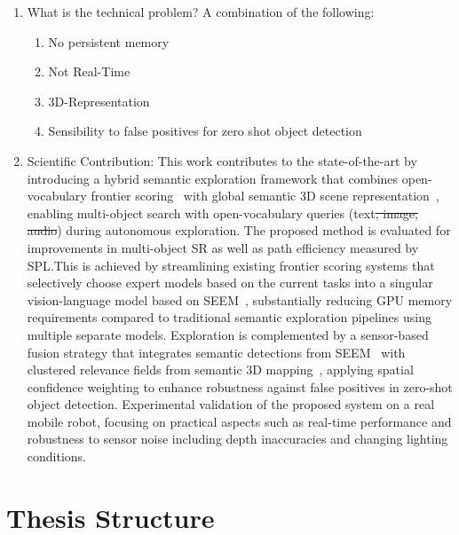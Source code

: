 \begin{enumerate}
    \item What is the technical problem? A combination of the following:
    \begin{enumerate}
        \item No persistent memory
        \item Not Real-Time
        \item 3D-Representation
        \item Sensibility to false positives for zero shot object detection
    \end{enumerate}
    \item Scientific Contribution:
        This work contributes to the state-of-the-art by introducing a hybrid semantic exploration framework that combines open-vocabulary frontier scoring~\cite{yokoyama2024vlfm} with global semantic 3D scene representation~\cite{kashu2023openfusion}, enabling multi-object search with open-vocabulary queries (text\sout{, image, audio}) during autonomous exploration. The proposed method is evaluated for improvements in multi-object \ac{SR} as well as path efficiency measured by \ac{SPL}.This is achieved by streamlining existing frontier scoring systems that selectively choose expert models based on the current tasks into a singular vision-language model based on \ac{SEEM}~\cite{zou2023seem}, substantially reducing GPU memory requirements compared to traditional semantic exploration pipelines using multiple separate models. Exploration is complemented by a sensor-based fusion strategy that integrates semantic detections from \ac{SEEM}~\cite{zou2023seem} with clustered relevance fields from semantic 3D mapping~\cite{kashu2023openfusion}, applying spatial confidence weighting to enhance robustness against false positives in zero-shot object detection. Experimental validation of the proposed system on a real mobile robot, focusing on practical aspects such as real-time performance and robustness to sensor noise including depth inaccuracies and changing lighting conditions.
\end{enumerate}

\section{Thesis Structure}
\blindtext
